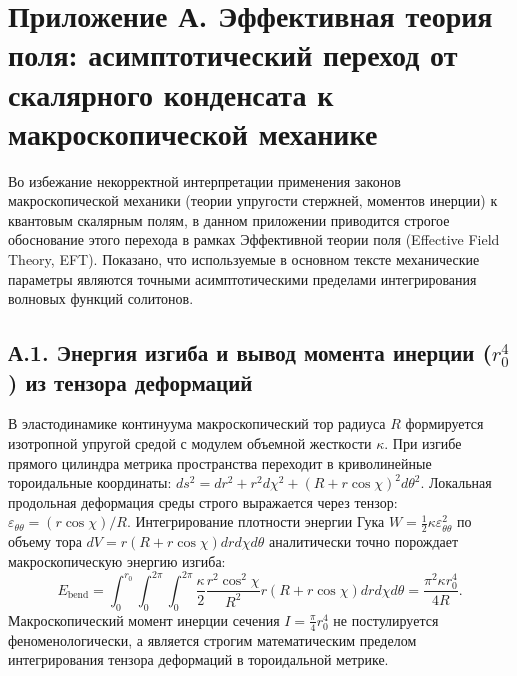 \documentclass[11pt,a4paper]{article}
\begin{document}
\section*{Приложение А. Эффективная теория поля: асимптотический переход от скалярного конденсата к макроскопической механике}

Во избежание некорректной интерпретации применения законов макроскопической механики (теории упругости стержней, моментов инерции) к квантовым скалярным полям, в данном приложении приводится строгое обоснование этого перехода в рамках Эффективной теории поля (Effective Field Theory, EFT). Показано, что используемые в основном тексте механические параметры являются точными асимптотическими пределами интегрирования волновых функций солитонов.

\subsection*{А.1. Энергия изгиба и вывод момента инерции ($r_0^4$) из тензора деформаций}
В эластодинамике континуума макроскопический тор радиуса $R$ формируется изотропной упругой средой с модулем объемной жесткости $\kappa$. При изгибе прямого цилиндра метрика пространства переходит в криволинейные тороидальные координаты: $ds^2 = dr^2 + r^2 d\chi^2 + (R + r\cos\chi)^2 d\theta^2$.
Локальная продольная деформация среды строго выражается через тензор: $\varepsilon_{\theta\theta} = (r \cos\chi)/R$.
Интегрирование плотности энергии Гука $W = \frac{1}{2} \kappa \varepsilon_{\theta\theta}^2$ по объему тора $dV = r(R + r\cos\chi) dr d\chi d\theta$ аналитически точно порождает макроскопическую энергию изгиба:
\begin{equation}
E_{\text{bend}} = \int_0^{r_0} \int_0^{2\pi} \int_0^{2\pi} \frac{\kappa}{2} \frac{r^2 \cos^2\chi}{R^2} r(R + r\cos\chi) dr d\chi d\theta = \frac{\pi^2 \kappa r_0^4}{4 R}.
\end{equation}
Макроскопический момент инерции сечения $I = \frac{\pi}{4} r_0^4$ не постулируется феноменологически, а является строгим математическим пределом интегрирования тензора деформаций в тороидальной метрике.
\end{document}
